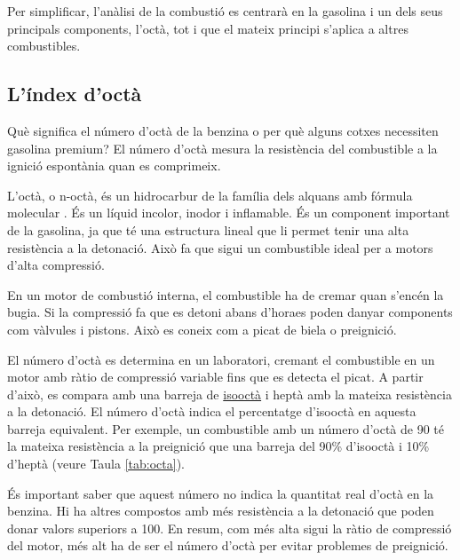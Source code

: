 Per simplificar, l'anàlisi de la combustió es centrarà en la gasolina i un dels seus principals components, l'octà, tot i que el mateix principi s'aplica a altres combustibles.

\subsection{L'índex d'octà}


    Què significa el número d'octà de la benzina o per què alguns cotxes necessiten gasolina premium? El número d'octà mesura la resistència del combustible a la ignició espontània quan es comprimeix.

    L'octà, o n-octà, és un hidrocarbur de la família dels alquans amb fórmula molecular . És un líquid incolor, inodor i inflamable. És un component important de la gasolina, ja que té una estructura lineal que li permet tenir una alta resistència a la detonació. Això fa que sigui un combustible ideal per a motors d'alta compressió.


En un motor de combustió interna, el combustible ha de cremar quan s'encén la bugia. Si la compressió fa que es detoni abans d'horaes poden danyar components com vàlvules i pistons. Això es coneix com a picat de biela o preignició.

El número d'octà es determina en un laboratori, cremant el combustible en un motor amb ràtio de compressió variable fins que es detecta el picat. A partir d'això, es compara amb una barreja de \href{https://www.ebi.ac.uk/chebi/searchId.do?printerFriendlyView=true&chebiId=62805&structureView=applet}{isooctà} i heptà amb la mateixa resistència a la detonació. El número d'octà indica el percentatge d'isooctà en aquesta barreja equivalent. Per exemple, un combustible amb un número d'octà de 90 té la mateixa resistència a la preignició que una barreja del 90\% d'isooctà i 10\% d'heptà (veure Taula \ref{tab:octa}).

És important saber que aquest número no indica la quantitat real d'octà en la benzina. Hi ha altres compostos amb més resistència a la detonació que poden donar valors superiors a 100. En resum, com més alta sigui la ràtio de compressió del motor, més alt ha de ser el número d'octà per evitar problemes de preignició.  
 
